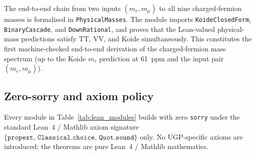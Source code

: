 \documentclass[11pt]{article}
\theoremstyle{remark}
\newcommand{\lean}[1]{\texttt{\small#1}}
\begin{document}
The end-to-end chain from two inputs $(m_e,m_\mu)$ to all nine charged-fermion
masses is formalised in \lean{PhysicalMasses}.  The module imports
\lean{KoideClosedForm}, \lean{BinaryCascade}, and \lean{DownRational}, and
proves that the Lean-valued physical-mass predictions satisfy TT, VV, and Koide
simultaneously.  This constitutes the first machine-checked end-to-end derivation
of the charged-fermion mass spectrum (up to the Koide $m_\tau$ prediction at
61~ppm and the input pair $(m_e,m_\mu)$).

\subsection{Zero-sorry and axiom policy}

Every module in Table~\ref{tab:lean_modules} builds with zero \lean{sorry} under
the standard Lean~4 / Mathlib axiom signature
$\{\mathtt{propext},\,\mathtt{Classical.choice},\,\mathtt{Quot.sound}\}$ only.
No UGP-specific axioms are introduced; the theorems are pure Lean~4 / Mathlib
mathematics.
\end{document}

